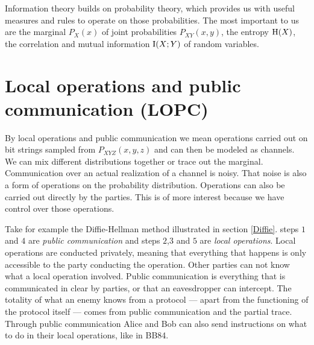     
    Information theory builds on probability theory, which provides us with useful measures and rules to operate on those probabilities.
    The most important to us are the marginal $P_X(x)$ of joint probabilities $P_{XY}(x,y)$, the entropy $\operatorname{H} (X)$, the correlation and mutual information $\operatorname{I}(X;Y)$ of random variables.
    
    
    
    
\section{Local operations and public communication (LOPC)}
    By local operations and public communication we mean operations carried out on bit strings sampled from $P_{XYZ}(x,y,z)$ and can then be modeled as channels.
    We can mix different distributions together or trace out the marginal.
    Communication over an actual realization of a channel is noisy. 
    That noise is also a form of operations on the probability distribution.
    Operations can also be carried out directly by the parties.
    This is of more interest because we have control over those operations.
    
    Take for example the Diffie-Hellman method illustrated in section \ref{Diffie}.
    steps $1$ and $4$ are \emph{public communication} and steps $2$,$3$ and $5$ are \emph{local operations}.
    Local operations are conducted privately, meaning that everything that happens is only accessible to the party conducting the operation.
    Other parties can not know what a local operation involved.
    Public communication is everything that is communicated in clear by parties, or that an eavesdropper can intercept.
    The totality of what an enemy knows from a protocol --- apart from the functioning of the protocol itself --- comes from public communication and the partial trace.
    Through public communication Alice and Bob can also send instructions on what to do in their local operations, like in BB84.
    
